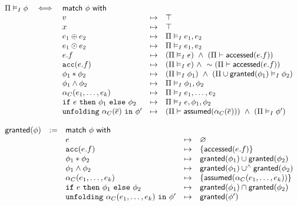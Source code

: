 \begin{align*}
\begin{array}{rclcl}
\Pi \vDash_I \phi &\iff& \textsf{match} \ \phi \ \textsf{with} &&
\\
&& v &\mapsto&
  \top
\\
&& x &\mapsto&
  \top
\\
&& e_1 \oplus e_2 &\mapsto&
  \Pi \vDash_I e_1, e_2
\\
&& e_1 \odot e_2 &\mapsto&
  \Pi \vDash_I e_1, e_2
\\
&& e.f &\mapsto&
  (\Pi \vDash_I e) \ \land \ (\Pi \vdash \textsf{accessed}(e.f))
\\
&& \texttt{acc}(e.f) &\mapsto&
  (\Pi \vDash_I e)  \ \land \
  \sim (\Pi \vdash \textsf{accessed}(e.f))
\\
&& \phi_1 \ast \phi_2 &\mapsto&
  (\Pi \vDash_I \phi_1) \ \land \
  (\Pi \cup \textsf{granted}(\phi_1) \vDash_I \phi_2)
\\
&& \phi_1 \land \phi_2 &\mapsto&
  \Pi \vDash_I \phi_1, \phi_2
\\
&& \alpha_C(e_1, \dots, e_k) &\mapsto&
  \Pi \vDash_I e_1, \dots, e_2
\\
&& \texttt{if} \ e \ \texttt{then} \ \phi_1 \ \texttt{else} \ \phi_2 &\mapsto&
  \Pi \vDash_I e, \phi_1, \phi_2
\\
&& \texttt{unfolding} \ \alpha_C(\overline{e}) \ \texttt{in} \ \phi^\prime &\mapsto&
  (\Pi \vdash \textsf{assumed}(\alpha_C(\overline{e}))) \ \land \
  (\Pi \vDash_I \phi^\prime)
\\
\end{array}
\end{align*}

\begin{align*}
\begin{array}{rclcl}
\textsf{granted}(\phi) &:=& \textsf{match} \ \phi \ \textsf{with} &&
\\
&& e &\mapsto&
  \varnothing
\\
&& \texttt{acc}(e.f) &\mapsto&
  \left\{  \textsf{accessed}(e.f)  \right\}
\\
&& \phi_1 \ast \phi_2 &\mapsto&
  \textsf{granted}(\phi_1) \cup \textsf{granted}(\phi_2)
\\
&& \phi_1 \land \phi_2 &\mapsto&
  \textsf{granted}(\phi_1) \cup^\land \textsf{granted}(\phi_2)
\\
&& \alpha_C(e_1, \dots, e_k) &\mapsto&
  \left\{  \textsf{assumed}(\alpha_C(e_1, \dots, e_k))  \right\}
\\
&& \texttt{if} \ e \ \texttt{then} \ \phi_1 \ \texttt{else} \ \phi_2 &\mapsto&
  \textsf{granted}(\phi_1) \cap \textsf{granted}(\phi_2)
\\
&& \texttt{unfolding} \ \alpha_C(e_1, \dots, e_k) \ \texttt{in} \ \phi^\prime &\mapsto&
  \textsf{granted}(\phi^\prime)
\\
\end{array}
\end{align*}

